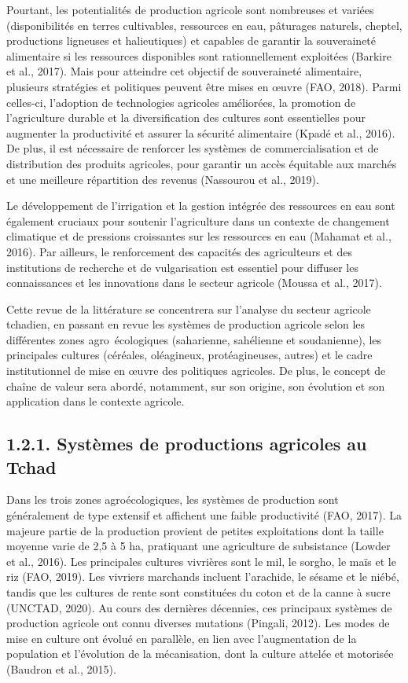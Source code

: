 \documentclass[12pt,oneside]{report}
\begin{document}
Pourtant, les potentialités de production agricole sont nombreuses et variées (disponibilités en terres cultivables, ressources en eau, pâturages naturels, cheptel, productions ligneuses et halieutiques) et capables de garantir la souveraineté alimentaire si les ressources disponibles sont rationnellement exploitées (Barkire et al., 2017). Mais pour atteindre cet objectif de souveraineté alimentaire, plusieurs stratégies et politiques peuvent être mises en œuvre (FAO, 2018). Parmi celles-ci, l'adoption de technologies agricoles améliorées, la promotion de l'agriculture durable et la diversification des cultures sont essentielles pour augmenter la productivité et assurer la sécurité alimentaire (Kpadé et al., 2016). De plus, il est nécessaire de renforcer les systèmes de commercialisation et de distribution des produits agricoles, pour garantir un accès équitable aux marchés et une meilleure répartition des revenus (Nassourou et al., 2019).

Le développement de l'irrigation et la gestion intégrée des ressources en eau sont également cruciaux pour soutenir l'agriculture dans un contexte de changement climatique et de pressions croissantes sur les ressources en eau (Mahamat et al., 2016). Par ailleurs, le renforcement des capacités des agriculteurs et des institutions de recherche et de vulgarisation est essentiel pour diffuser les connaissances et les innovations dans le secteur agricole (Moussa et al., 2017).

Cette revue de la littérature se concentrera sur l'analyse du secteur agricole tchadien, en passant en revue les systèmes de production agricole selon les différentes zones agro écologiques (saharienne, sahélienne et soudanienne), les principales cultures (céréales, oléagineux, protéagineuses, autres) et le cadre institutionnel de mise en œuvre des politiques agricoles. De plus, le concept de chaîne de valeur sera abordé, notamment, sur son origine, son évolution et son application dans le contexte agricole.

\subsection{1.2.1. Systèmes de productions agricoles au Tchad}
Dans les trois zones agroécologiques, les systèmes de production sont généralement de type extensif et affichent une faible productivité (FAO, 2017). La majeure partie de la production provient de petites exploitations dont la taille moyenne varie de 2,5 à 5 ha, pratiquant une agriculture de subsistance (Lowder et al., 2016). Les principales cultures vivrières sont le mil, le sorgho, le maïs et le riz (FAO, 2019). Les vivriers marchands incluent l’arachide, le sésame et le niébé, tandis que les cultures de rente sont constituées du coton et de la canne à sucre (UNCTAD, 2020). Au cours des dernières décennies, ces principaux systèmes de production agricole ont connu diverses mutations (Pingali, 2012). Les modes de mise en culture ont évolué en parallèle, en lien avec l’augmentation de la population et l’évolution de la mécanisation, dont la culture attelée et motorisée (Baudron et al., 2015).
\end{document}
